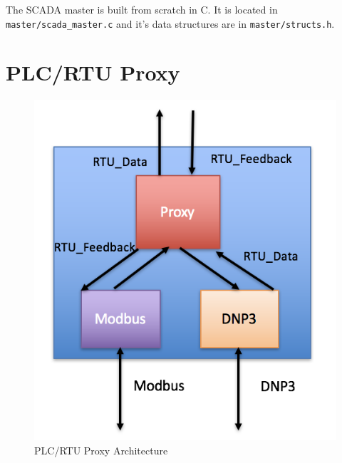 \documentclass[oneside,11pt,a4paper,oldfontcommands]{book}
\def\code#1{\texttt{#1}}
\begin{document}
\indent
The SCADA master is built from scratch in C. It is located in \code{master/scada\_master.c}
and it's data structures are in \code{master/structs.h}. \\

\section{PLC/RTU Proxy}
\begin{figure}[ht]
  \begin{center}
  \includegraphics{proxy}
  \caption{PLC/RTU Proxy Architecture}
  \label{fig:4}
  \end{center}
\end{figure}
\end{document}
